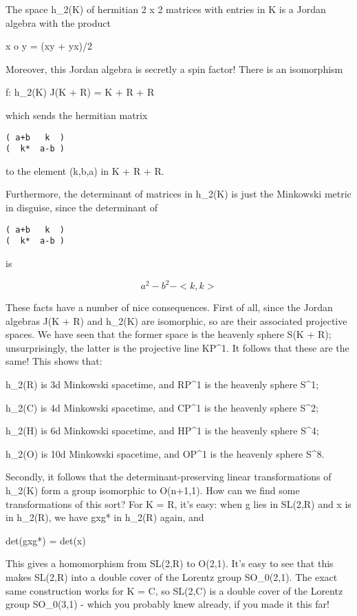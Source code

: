 The space h_{2}(K) of hermitian 2 x 2 matrices with entries in K is a
Jordan algebra with the product 

x o y = (xy + yx)/2

Moreover, this Jordan algebra is secretly a spin factor!  There is an 
isomorphism 

f: h_{2}(K) \to  J(K + R) = K + R + R

which sends the hermitian matrix

\begin{verbatim}
( a+b   k  )
(  k*  a-b )
\end{verbatim}
    

to the element (k,b,a) in K + R + R.

Furthermore, the determinant of matrices in h_{2}(K) is just the
Minkowski metric in disguise, since the determinant of

\begin{verbatim}
( a+b   k  ) 
(  k*  a-b )
\end{verbatim}
    
is

$$
a^{2} - b^{2} - <k,k>

$$
    
These facts have a number of nice consequences.  First of all, since the
Jordan algebras J(K + R) and h_{2}(K) are isomorphic, so are
their associated projective spaces.  We have seen that the former space
is the heavenly sphere S(K + R); unsurprisingly, the latter is the
projective line KP^{1}.  It follows that these are the same!
This shows that:

h_{2}(R) is 3d Minkowski spacetime, and RP^{1} is
the heavenly sphere S^{1};

h_{2}(C) is 4d Minkowski spacetime, and CP^{1} is the heavenly
sphere S^{2}; 

h_{2}(H) is 6d Minkowski spacetime, and HP^{1} is the
heavenly sphere S^{4};

h_{2}(O) is 10d Minkowski spacetime, and OP^{1} is the
heavenly sphere S^{8}.



Secondly, it follows that the determinant-preserving linear
transformations of h_{2}(K) form a group isomorphic to O(n+1,1).
How can we find some transformations of this sort?  For K = R, it's
easy: when g lies in SL(2,R) and x is in h_{2}(R), we have gxg*
in h_{2}(R) again, and

det(gxg*) = det(x)

This gives a homomorphism from SL(2,R) to O(2,1).  It's easy to see that
this makes SL(2,R) into a double cover of the Lorentz group
SO_{0}(2,1). The exact same construction works for K = C, so
SL(2,C) is a double cover of the Lorentz group SO_{0}(3,1) -
which you probably knew already, if you made it this far!

